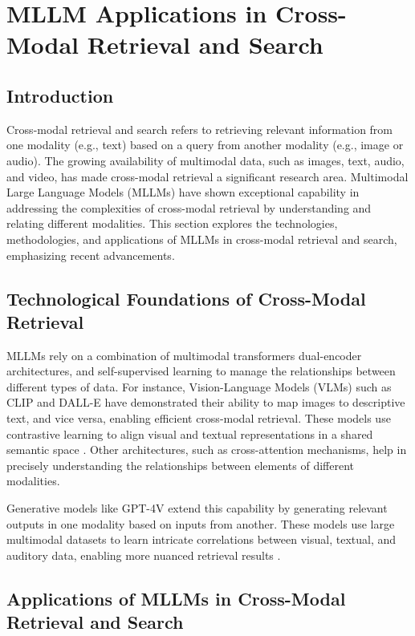 \documentclass{article}
\begin{document}
\section{MLLM Applications in Cross-Modal Retrieval and Search}

\subsection{Introduction}

Cross-modal retrieval and search refers to retrieving relevant information from one modality (e.g., text) based on a query from another modality (e.g., image or audio). The growing availability of multimodal data, such as images, text, audio, and video, has made cross-modal retrieval a significant research area. Multimodal Large Language Models (MLLMs) have shown exceptional capability in addressing the complexities of cross-modal retrieval by understanding and relating different modalities. This section explores the technologies, methodologies, and applications of MLLMs in cross-modal retrieval and search, emphasizing recent advancements.

\subsection{Technological Foundations of Cross-Modal Retrieval}

MLLMs rely on a combination of multimodal transformers dual-encoder architectures, and self-supervised learning to manage the relationships between different types of data. For instance, Vision-Language Models (VLMs) such as CLIP and DALL-E have demonstrated their ability to map images to descriptive text, and vice versa, enabling efficient cross-modal retrieval. These models use contrastive learning to align visual and textual representations in a shared semantic space \cite{vs2024li,vs2015ranjan}. Other architectures, such as cross-attention mechanisms, help in precisely understanding the relationships between elements of different modalities.

Generative models like GPT-4V extend this capability by generating relevant outputs in one modality based on inputs from another. These models use large multimodal datasets to learn intricate correlations between visual, textual, and auditory data, enabling more nuanced retrieval results \cite{vs2024gomez}. 

\subsection{Applications of MLLMs in Cross-Modal Retrieval and Search}
\end{document}
